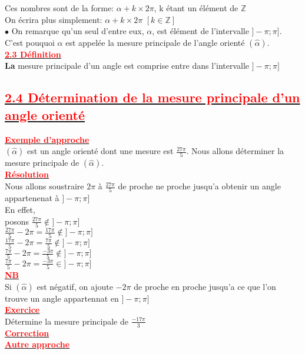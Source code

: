 \documentclass[12pt]{article}
\begin{document}
Ces nombres sont de la forme: $\alpha+k \times 2\pi$, k étant un élément de $\mathbb{Z}$\\
On écrira plus simplement: $\alpha+k \times 2\pi$ $[k\in\mathbb{Z}]$\\
$\bullet$ On remarque qu'un seul d'entre eux, $\alpha$, est élément de l'intervalle $]-\pi ; \pi]$.\\
C'est pouquoi $\alpha$ est appelée la mesure principale de l'angle orienté 
$(\hat{\alpha})$.\\
\underline{\textbf{\textcolor{red}{2.3 Définition}}}\\
\textbf{La} mesure principale d'un angle est comprise entre dans l'intervalle $]-\pi ; \pi]$
\subsection*{\underline{\textbf{\textcolor{red}{2.4 Détermination de la mesure principale d'un angle orienté}}}}
\underline{\textbf{\textcolor{red}{Exemple d'approche}}}\\
$(\hat{\alpha})$ est un angle orienté dont une mesure est $\frac{27\pi}{5}$. Nous allons déterminer la mesure principale de $(\hat{\alpha})$.\\
\underline{\textbf{\textcolor{red}{Résolution}}}\\
Nous allons soustraire $2\pi$ à $\frac{27\pi}{5}$ de proche ne proche jusqu'a obtenir un angle appartenenat à $]-\pi ; \pi]$\\
En effet,\\ posons $\frac{27\pi}{5} \notin ]-\pi ; \pi]$\\
$\frac{27\pi}{5}-2\pi=\frac{17\pi}{5} \notin ]-\pi ; \pi]$\\
$\frac{17\pi}{5}-2\pi=\frac{7\pi}{5} \notin ]-\pi ; \pi]$\\
$\frac{7\pi}{5}-2\pi=\frac{-3\pi}{5} \notin ]-\pi ; \pi]$\\
$\frac{7\pi}{5}-2\pi=\frac{-3\pi}{5} \in ]-\pi ; \pi]$\\
\underline{\textbf{\textcolor{red}{NB}}}\\
Si $(\hat{\alpha})$ est négatif, on ajoute $-2\pi$ de proche en proche jusqu'a ce que l'on trouve un angle appartennat en $]-\pi ; \pi]$\\
\underline{\textbf{\textcolor{red}{Exercice}}}\\
Détermine la mesure principale de $\frac{-17\pi}{3}$\\
\underline{\textbf{\textcolor{red}{Correction}}}\\
\underline{\textbf{\textcolor{red}{Autre approche}}}\\
\end{document}
